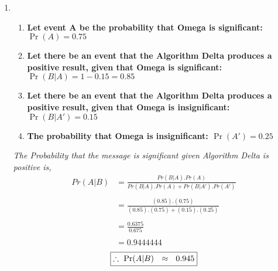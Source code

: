 \documentclass{article}
\begin{document}
\begin{enumerate}
\item 
  \begin{enumerate}
    \item \textbf{Let event A be the probability that Omega is significant: $\Pr(A) = 0.75$}
    \item \textbf{Let there be an event that the Algorithm Delta produces a positive result, given that Omega is significant: $\Pr(B|A) = 1-0.15 = 0.85$}
    \item \textbf{Let there be an event that the Algorithm Delta produces a positive result, given that Omega is insignificant: $\Pr(B|A') = 0.15$}
    \item \textbf{The probability that Omega is insignificant: $\Pr(A') = 0.25$}\\
  \end{enumerate}
  \textit{The Probability that the message is significant given Algorithm Delta is positive is,}
  \begin{align*}
    Pr(A|B) &= \frac{Pr(B|A).Pr(A)}{Pr(B|A).Pr(A) + Pr(B|A').Pr(A')}\\\\
    &= \frac{(0.85). (0.75)}{(0.85). (0.75) + (0.15). (0.25)}\\\\
    &= \frac{0.6375}{0.675}\\\\
    &= 0.9444444
  \end{align*}
  \[
     \boxed{\therefore\ \Pr(A|B )\ \ \approx \ \ 0.945}\\
  \]


\end{enumerate}
\end{document}
